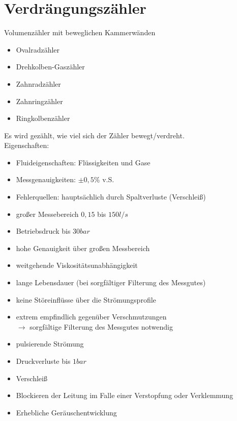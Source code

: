 \section{Verdrängungszähler}
Volumenzähler mit beweglichen Kammerwänden
\begin{itemize}
\item Ovalradzähler
\item Drehkolben-Gaszähler
\item Zahnradzähler
\item Zahnringzähler
\item Ringkolbenzähler
\end{itemize}
Es wird gezählt, wie viel sich der Zähler bewegt/verdreht.\\
Eigenschaften:
\begin{itemize}
\item Fluideigenschaften: Flüssigkeiten und Gase
\item Messgenauigkeiten: $\pm 0,5\%$ v.S.
\item Fehlerquellen: hauptsächlich durch Spaltverluste (Verschleiß)
\end{itemize}
\begin{itemize}[label=$+$]
\item großer Messebereich $0,15$ bis $150 \unit{l/s}$
\item Betriebsdruck bis $30 \unit{bar}$
\item hohe Genauigkeit über großen Messbereich
\item weitgehende Viskositätsunabhängigkeit
\item lange Lebensdauer (bei sorgfältiger Filterung des Messgutes)
\item keine Störeinflüsse über die Strömungsprofile
\end{itemize}
\begin{itemize}[label=$-$]
\item extrem empfindlich gegenüber Verschmutzungen\\
$\to$ sorgfältige Filterung des Messgutes notwendig
\item pulsierende Strömung
\item Druckverluste bis $1 \unit{bar}$
\item Verschleiß
\item Blockieren der Leitung im Falle einer Verstopfung oder Verklemmung
\item Erhebliche Geräuschentwicklung
\end{itemize}
